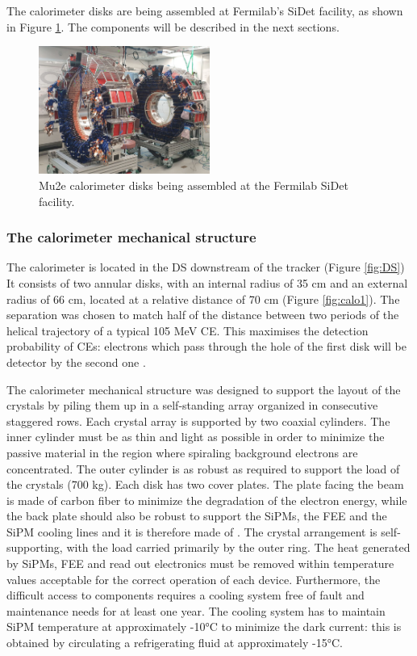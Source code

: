 The calorimeter disks are being assembled at Fermilab's SiDet facility, as shown in Figure 
\ref{fig:calostatus}. The components will be described in the next sections.

\begin{figure}[!h]
    \centering
    \includegraphics[width =0.5\textwidth]{figures/png/Screenshot_20240706_151533.png}
    \caption[The Mu2e calorimeter disks.]{Mu2e calorimeter disks being assembled at the Fermilab SiDet facility.}
    \label{fig:calostatus}
\end{figure}

\subsubsection{The calorimeter mechanical structure}
The calorimeter is located in the DS downstream of the tracker (Figure \ref{fig:DS})
It consists of two annular disks, with an internal radius of 35 cm and 
an external radius of 66 cm, located at a relative distance of 70 cm (Figure \ref{fig:calo1}).
The separation was chosen to match half of the distance between two periods of the helical trajectory 
of a typical 105 MeV CE. This maximises the detection probability of CEs: electrons which pass through the hole of the first disk will be detector by the second one \cite{em7}. 


The calorimeter mechanical structure was designed to support the layout of the crystals 
by piling them up in a self-standing array organized in consecutive staggered rows. 
Each crystal array is supported by two coaxial cylinders. The inner cylinder must be 
as thin and light as possible in order to minimize the passive material in the 
region where spiraling background electrons are concentrated. The outer cylinder 
is as robust as required to support the load of the crystals (700 kg). Each disk 
has two cover plates. The plate facing the beam is made of carbon fiber to minimize 
the degradation of the electron energy, while the back plate should also be robust 
to support the SiPMs, the FEE and the SiPM cooling lines and it 
is therefore made of .
The crystal arrangement is 
self-supporting, with the load carried primarily by the outer ring. 
The heat generated by SiPMs, FEE and read out electronics 
must be removed within temperature values acceptable for the correct operation 
of each device. Furthermore, the difficult access to components requires a 
cooling system free of fault and maintenance needs for at least one year. 
The cooling system has to maintain SiPM temperature at approximately -10°C to 
minimize the dark current: this is obtained by circulating a refrigerating fluid at approximately  -15°C.


